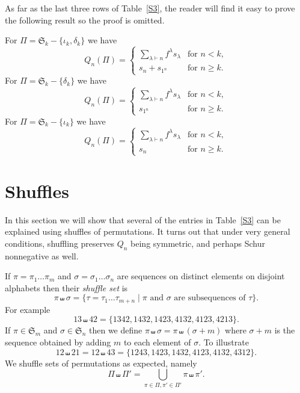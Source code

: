 \documentclass[ALCO,ThmDefs,Unicode,epreuves]{cedram}
\newcommand{\shu}{\shuffle}
\newcommand{\ptn}{\vdash}
\newcommand{\de}{\delta}
\newcommand{\io}{\iota}
\newcommand{\la}{\lambda}
\newcommand{\si}{\sigma}
\newcommand{\fS}{{\mathfrak S}}
\newcommand{\dil}{\displaystyle}
\begin{document}
As far as the last three rows of Table~\ref{S3}, the reader will find it easy to prove the following result so the proof is omitted.
\begin{prop}
For $\Pi=\fS_k-\{\io_k,\de_k\}$ we have
\[
Q_n(\Pi)=\begin{cases}
\dil\sum_{\la\ptn n} f^\la s_\la &\text{for }n<k, \\%
s_n+s_{1^n}&\text{for }n\ge k.
\end{cases}
\]
For $\Pi=\fS_k-\{\de_k\}$ we have
\[
Q_n(\Pi)=\begin{cases}
\dil\sum_{\la\ptn n} f^\la s_\la & \text{for }n<k,\\%
s_{1^n} &\text{for }n\ge k.
\end{cases}
\]
For $\Pi=\fS_k-\{\io_k\}$ we have
\[
Q_n(\Pi)=\begin{cases}
\dil\sum_{\la\ptn n} f^\la s_\la& \text{for }n<k,\\ %
s_n & \text{for }n\ge k.%
\end{cases}
\]
\end{prop}





\section{Shuffles}
\label{shu}

In this section we will show that several of the entries in Table~\ref{S3} can be explained using shuffles of permutations. It turns out that under very general conditions, shuffling preserves $Q_n$ being symmetric, and perhaps Schur nonnegative as well.

If $\pi=\pi_1\dots\pi_m$ and $\si=\si_1\dots\si_n$ are sequences on distinct elements on disjoint alphabets then their \emph{shuffle set} is
\[
\pi\shu\si =\{\tau=\tau_1\dots\tau_{m+n} \mid \text{$\pi$ and $\si$ are subsequences of $\tau$}\}.
\]
For example
\[
13\shu 42 = \{1342, 1432, 1423, 4132, 4123, 4213\}.
\]
If $\pi\in\fS_m$ and $\si\in\fS_n$ then we define $\pi\shu\si = \pi\shu(\si+m)$ where $\si+m$ is the sequence obtained by adding $m$ to each element of $\si$. To illustrate
\[
12\shu 21 = 12 \shu 43 =\{1243, 1423, 1432, 4123, 4132, 4312\}.
\]
We shuffle sets of permutations as expected, namely
\[
\Pi\shu\Pi' = \bigcup_{\pi\in\Pi,\pi'\in\Pi'} \pi\shu\pi'.
\]
\end{document}
